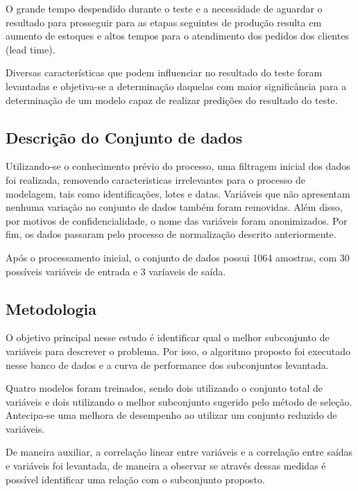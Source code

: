 O grande tempo despendido durante o teste e a necessidade de aguardar o resultado para prosseguir para as etapas seguintes de produção resulta em aumento de estoques e altos tempos para o atendimento dos pedidos dos clientes (lead time).

Diversas características que podem influenciar no resultado do teste foram levantadas e objetiva-se a determinação daquelas com maior significância para a determinação de um modelo capaz de realizar predições do resultado do teste.

\subsection{Descrição do Conjunto de dados}

Utilizando-se o conhecimento prévio do processo, uma filtragem inicial dos dados foi realizada, removendo caracteristicas irrelevantes para o processo de modelagem, tais como identificações, lotes e datas. Variáveis que não apresentam nenhuma variação no conjunto de dados também foram removidas. Além disso, por motivos de confidencialidade, o nome das variáveis foram anonimizados. Por fim, os dados passaram pelo processo de normalização descrito anteriormente.

Após o processamento inicial, o conjunto de dados possui 1064 amostras, com 30 possíveis variáveis de entrada e 3 varíaveis de saída.

\subsection{Metodologia}

O objetivo principal nesse estudo é identificar qual o melhor subconjunto de variáveis para descrever o problema. Por isso, o algoritmo proposto foi executado nesse banco de dados e a curva de performance dos subconjuntos levantada. 

Quatro modelos foram treinados, sendo dois utilizando o conjunto total de variáveis e dois utilizando o melhor subconjunto sugerido pelo método de seleção. Antecipa-se uma melhora de desempenho ao utilizar um conjunto reduzido de variáveis.

De maneira auxiliar, a correlação linear entre variáveis e a correlação entre saídas e variáveis foi levantada, de maneira a observar se através dessas medidas é possível identificar uma relação com o subconjunto proposto.